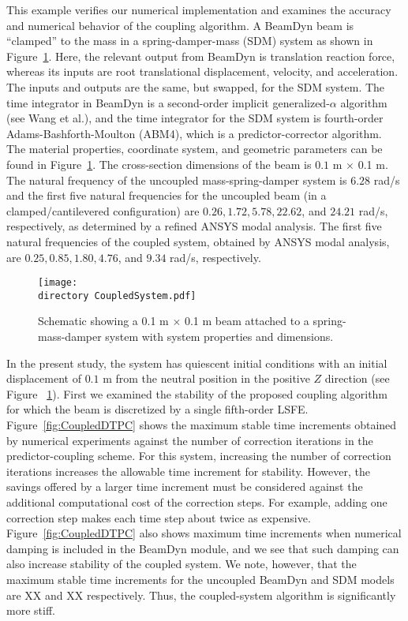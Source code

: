 \documentclass{aiaa-tc}
\def\directory{EPSF/}
\begin{document}
This example verifies our numerical implementation and examines the accuracy and numerical behavior of the coupling algorithm. 
A BeamDyn beam is ``clamped'' to the mass in a spring-damper-mass (SDM) system as shown in Figure~\ref{fig:CoupledSystem}.     
Here, the relevant output from BeamDyn is translation reaction force, whereas its inputs are root translational displacement, velocity, and acceleration.  
The inputs and outputs are the same, but swapped, for the SDM system.
The time integrator in BeamDyn is a second-order implicit generalized-$\alpha$ algorithm (see Wang et al.\cite{Wang:2014}), and the time integrator for the SDM system is fourth-order Adams-Bashforth-Moulton (ABM4), which is a predictor-corrector algorithm.
The material properties, coordinate system, and geometric parameters can be found in Figure~\ref{fig:CoupledSystem}. 
The cross-section dimensions of the beam is $0.1$ m $\times$ 0.1 m. 
The natural frequency of the uncoupled mass-spring-damper system is $6.28$ rad/s and the first five natural frequencies for the uncoupled beam (in a clamped/cantilevered configuration) are $0.26, 1.72, 5.78, 22.62$, and $24.21$ rad/s, respectively, as determined by a refined ANSYS modal analysis. 
The first five natural frequencies of the coupled system, obtained by ANSYS modal analysis, are $0.25, 0.85, 1.80, 4.76$, and $9.34$ rad/s, respectively.

\begin{figure}
\centering
\texttt{[image: \\directory CoupledSystem.pdf]}
\caption{Schematic showing a 0.1 m $\times$ 0.1 m beam attached to a spring-mass-damper system with system properties and dimensions.} 
\label{fig:CoupledSystem}
\end{figure}
 
In the present study, the system has quiescent initial conditions with an initial displacement of $0.1$ m from the neutral position in the positive $Z$ direction (see Figure ~\ref{fig:CoupledSystem}). 
First we examined the stability of the proposed coupling algorithm for which the beam is discretized by a single fifth-order LSFE. 
Figure~\ref{fig:CoupledDTPC} shows the maximum stable time increments obtained by numerical experiments against the number of correction iterations in the predictor-coupling scheme.  
For this system, increasing the number of correction iterations increases the allowable time increment for stability.  However, the savings offered by a larger time increment must be considered against the additional computational cost of the correction steps.  
For example, adding one correction step makes each time step about twice as expensive.
Figure~\ref{fig:CoupledDTPC} also shows maximum time increments when numerical damping is included in the BeamDyn module, and we see that such damping can also increase stability of the coupled system.  We note, however, that the maximum stable time increments for the uncoupled BeamDyn and SDM models are XX and XX respectively.  Thus, the coupled-system algorithm is significantly more stiff.
\end{document}
